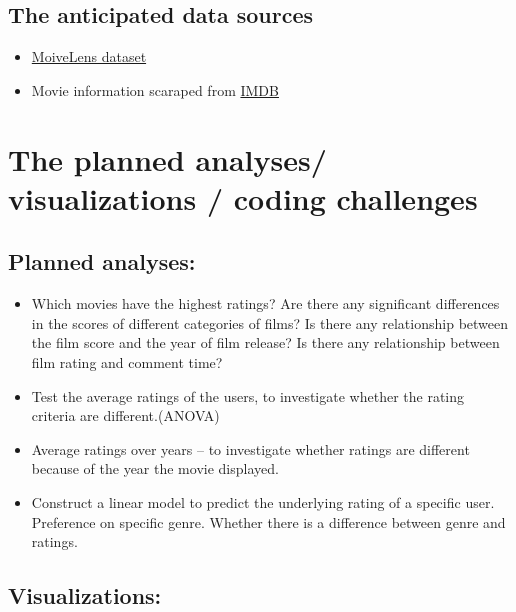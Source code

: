 \documentclass[
]{article}
\begin{document}
\hypertarget{the-anticipated-data-sources}{%
\subsection{The anticipated data
sources}\label{the-anticipated-data-sources}}

\begin{itemize}
\item
  \href{https://grouplens.org/datasets/movielens/latest/}{MoiveLens
  dataset}
\item
  Movie information scaraped from \href{}{IMDB}
\end{itemize}

\hypertarget{the-planned-analyses-visualizations-coding-challenges}{%
\section{The planned analyses/ visualizations / coding
challenges}\label{the-planned-analyses-visualizations-coding-challenges}}

\hypertarget{planned-analyses}{%
\subsection{Planned analyses:}\label{planned-analyses}}

\begin{itemize}
\item
  Which movies have the highest ratings? Are there any significant
  differences in the scores of different categories of films? Is there
  any relationship between the film score and the year of film release?
  Is there any relationship between film rating and comment time?
\item
  Test the average ratings of the users, to investigate whether the
  rating criteria are different.(ANOVA)
\item
  Average ratings over years -- to investigate whether ratings are
  different because of the year the movie displayed.
\item
  Construct a linear model to predict the underlying rating of a
  specific user. Preference on specific genre. Whether there is a
  difference between genre and ratings.
\end{itemize}

\hypertarget{visualizations}{%
\subsection{Visualizations:}\label{visualizations}}
\end{document}
